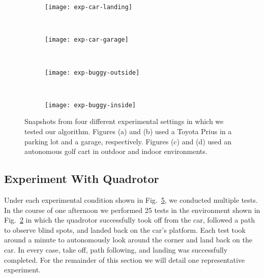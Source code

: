 \begin{figure}[t!]

    \centering

    \begin{subfigure}[t]{0.4\textwidth}

        \centering
        \texttt{[image: exp-car-landing]}
        \caption{}

        \label{fig:exp-car-landing}

    \end{subfigure}
    ~
    \begin{subfigure}[t]{0.4\textwidth}

        \centering
        \texttt{[image: exp-car-garage]}
        \caption{}

        \label{fig:exp-car-garage}

    \end{subfigure}
    ~
    \begin{subfigure}[t]{0.4\textwidth}

        \centering
        \texttt{[image: exp-buggy-outside]}
        \caption{}

        \label{fig:exp-buggy-outside}

    \end{subfigure}
    ~
    \begin{subfigure}[t]{0.4\textwidth}

        \centering
        \texttt{[image: exp-buggy-inside]}
        \caption{}

        \label{fig:exp-buggy-inside}

    \end{subfigure}

    \caption{Snapshots from four different experimental settings in which we tested our
    algorithm. Figures (a) and (b) used a Toyota Prius in a parking lot and a garage, respectively. Figures (c) and (d) used an autonomous golf cart in outdoor and indoor environments.}

    \label{fig:exps}

\end{figure}

\subsection{Experiment With Quadrotor}

Under each experimental condition shown in Fig.~\ref{fig:exps}, we conducted
multiple tests. In the course of one afternoon we performed 25 tests in the
environment shown in Fig.~\ref{fig:exp-car-garage} in which the quadrotor
successfully took off from the car, followed a path to observe blind spots, and
landed back on the car's platform. Each test took around a minute to
autonomously look around the corner and land back on the car. In every case,
take off, path following, and landing was successfully completed.  For the
remainder of this section we will detail one representative experiment.

